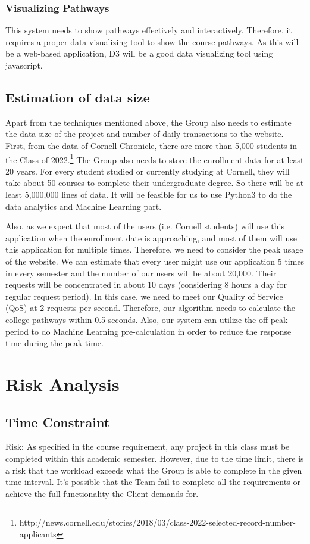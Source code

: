 \documentclass{article}
\begin{document}
\subsubsection{Visualizing Pathways}
This system needs to show pathways effectively and interactively. Therefore, it requires a proper data visualizing tool to show the course pathways. As this will be a web-based application, D3 will be a good data visualizing tool using javascript.

\subsection{Estimation of data size}
Apart from the techniques mentioned above, the Group also needs to estimate the data size of the project and number of daily transactions to the website. First, from the data of Cornell Chronicle, there are more than 5,000 students in the Class of 2022.\footnote{http://news.cornell.edu/stories/2018/03/class-2022-selected-record-number-applicants} The Group also needs to store the enrollment data for at least 20 years. For every student studied or currently studying at Cornell, they will take about 50 courses to complete their undergraduate degree. So there will be at least 5,000,000 lines of data. It will be feasible for us to use Python3 to do the data analytics and Machine Learning part.

\vspace{0.4cm}Also, as we expect that most of the users (i.e. Cornell students) will use this application when the enrollment date is approaching, and most of them will use this application for multiple times. Therefore, we need to consider the peak usage of the website. We can estimate that every user might use our application 5 times in every semester and the number of our users will be about 20,000. Their requests will be concentrated in about 10 days (considering 8 hours a day for regular request period). In this case, we need to meet our Quality of Service (QoS) at 2 requests per second. Therefore, our algorithm needs to calculate the college pathways within 0.5 seconds. Also, our system can utilize the off-peak period to do Machine Learning pre-calculation in order to reduce the response time during the peak time.

\section{Risk Analysis}
\subsection{Time Constraint}
Risk: As specified in the course requirement, any project in this class must be completed within this academic semester. However, due to the time limit, there is a risk that the workload exceeds what the Group is able to complete in the given time interval. It’s possible that the Team fail to complete all the requirements or achieve the full functionality the Client demands for.
\end{document}
